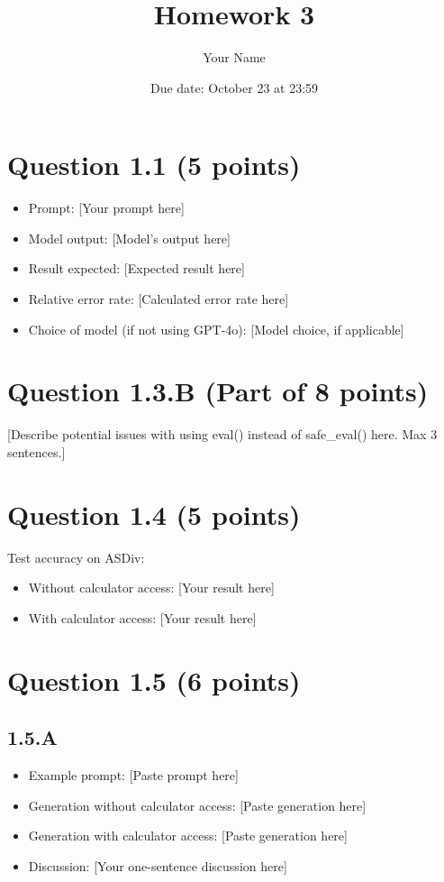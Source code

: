 \documentclass{article}
\title{Homework 3}
\author{Your Name}
\date{Due date: October 23 at 23:59}
\begin{document}
\maketitle

\section*{Question 1.1 (5 points)}

\begin{itemize}
    \item Prompt: [Your prompt here]
    \item Model output: [Model's output here]
    \item Result expected: [Expected result here]
    \item Relative error rate: [Calculated error rate here]
    \item Choice of model (if not using GPT-4o): [Model choice, if applicable]
\end{itemize}

\section*{Question 1.3.B (Part of 8 points)}

[Describe potential issues with using eval() instead of safe\_eval() here. Max 3 sentences.]

\section*{Question 1.4 (5 points)}

Test accuracy on ASDiv:
\begin{itemize}
    \item Without calculator access: [Your result here]
    \item With calculator access: [Your result here]
\end{itemize}

\section*{Question 1.5 (6 points)}

\subsection*{1.5.A}

\begin{itemize}
    \item Example prompt: [Paste prompt here]
    \item Generation without calculator access: [Paste generation here]
    \item Generation with calculator access: [Paste generation here]
    \item Discussion: [Your one-sentence discussion here]
\end{itemize}
\end{document}

